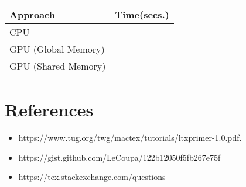 \documentclass[12pt, a4paper]{article}
\begin{document}
	\begin{tabu} to 1 \textwidth { | X[l] | X[r] | }
		 \hline
		 \textbf{Approach} & \textbf{Time(secs.)}  \\
		 \hline
		 CPU &   \\
		 \hline
		 GPU (Global Memory) &   \\
		 \hline
		 GPU (Shared Memory) &   \\
		 \hline
	\end{tabu}		

	\newpage


	\section{References}

	\begin{itemize}
	  \item https://www.tug.org/twg/mactex/tutorials/ltxprimer-1.0.pdf.
	  \item https://gist.github.com/LeCoupa/122b12050f5fb267e75f
	  \item https://tex.stackexchange.com/questions
	\end{itemize}
\end{document}
